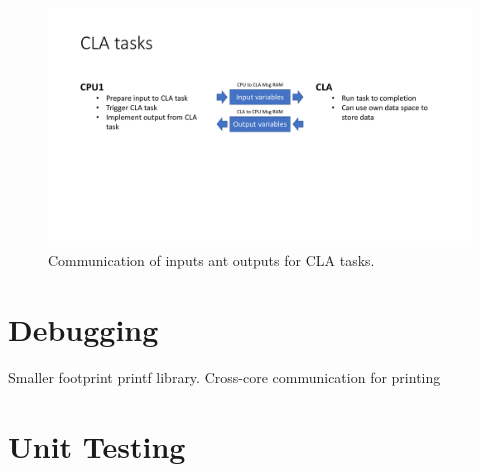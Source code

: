 \begin{figure}[H]
    \centering \includegraphics[width=1.0\textwidth]{./figures/CLA_communication.pdf}
    \caption{Communication of inputs ant outputs for CLA tasks.}
    \label{fig:CLA_communication}
\end{figure}

\section{Debugging}

Smaller footprint printf library. Cross-core communication for printing

\section{Unit Testing}
